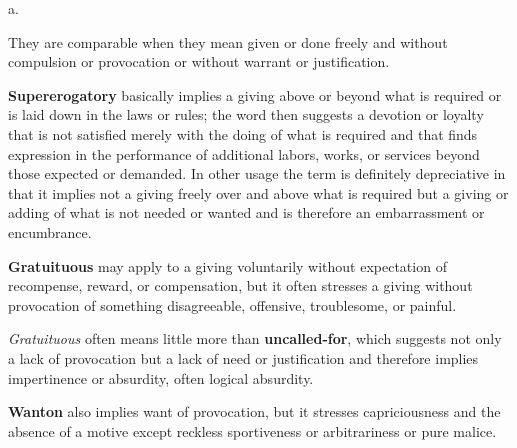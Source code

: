 \begin{description}[style=unboxed]
a.
\begin{mynewitemize}
\item They are comparable when they mean given or done freely and without
compulsion or provocation or without warrant or justification.
\item \textbf{Supererogatory} basically implies a giving above or beyond what is
required or is laid down in the laws or rules; the word then suggests a devotion
or loyalty that is not satisfied merely with the doing of what is required and
that finds expression in the performance of additional labors, works, or
services beyond those expected or demanded. In other usage the term is
definitely depreciative in that it implies not a giving freely over and above
what is required but a giving or adding of what is not needed or wanted and is
therefore an embarrassment or encumbrance.
\item \textbf{Gratuituous} may apply to a giving voluntarily without expectation
of recompense, reward, or compensation, but it often stresses a giving without
provocation of something disagreeable, offensive, troublesome, or painful.
\item \textit{Gratuituous} often means little more than \textbf{uncalled-for},
which suggests not only a lack of provocation but a lack of need or
justification and therefore implies impertinence or absurdity, often logical
absurdity.
\item \textbf{Wanton} also implies want of provocation, but it stresses
capriciousness and the absence of a motive except reckless sportiveness or
arbitrariness or pure malice.
\end{mynewitemize}


\end{description}
